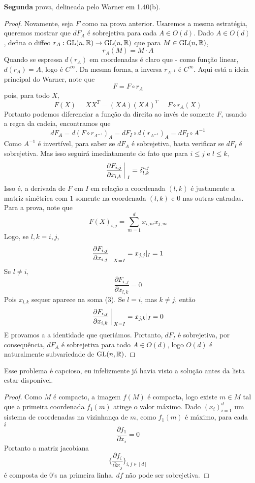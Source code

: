 \textbf{Segunda} prova, delineada pelo Warner em 1.40(b).
\begin{proof}
    Novamente, seja $F$ como na prova anterior. Usaremos a mesma estratégia, queremos mostrar 
    que $dF_A$ é sobrejetiva para cada $A \in O(d)$. Dado $A \in O(d)$, defina o diffeo $r_A : \text{GL}(n,\mathbb{R}) \rightarrow \text{GL}(n,\mathbb{R})$ 
    que para $M \in \text{GL}(n,\mathbb{R})$,
    $$r_A(M) = M\cdot A$$
    Quando se espressa $d(r_A)$ em coordenadas é claro que - como função linear, $d(r_A) = A$, logo é $C^\infty$. Da mesma forma, a inversa 
    $r_{A^{-1}}$ é $C^\infty$. Aqui está a ideia principal do Warner, note que 
    $$F = F \circ r_A$$
    pois, para todo $X$,
    $$F(X) = XX^T = (XA)(XA)^T = F \circ r_A (X)$$
    Portanto podemos diferenciar a função da direita ao invés de somente $F$, usando a regra da cadeia, encontramos que
    $$dF_A = d(F \circ r_{A^{-1}})_A = dF_{I} \circ d(r_{A^{-1}})_A = dF_{I} \circ A^{-1}$$
    Como $A^{-1}$ é invertível, para saber se $dF_A$ é sobrejetiva, basta verificar se $dF_I$ é sobrejetiva.
    Mas isso seguirá imediatamente do fato que para $i \leq j$ e $l \leq k$,
    $$\frac{\partial F_{i,j}}{\partial x_{l,k}}\bigg\arrowvert_I = \delta^{i,j}_{l,k}$$
    Isso é, a derivada de $F$ em $I$ em relação a coordenada $(l,k)$ é justamente a matriz simétrica com $1$ somente na 
    coordenada $(l,k)$ e $0$ nas outras entradas.
    Para a prova, note que
    \begin{equation}
        F(X)_{i,j} = \sum_{m = 1}^{d} x_{i,m}  x_{j,m}
    \end{equation}
    Logo, se $l,k = i,j$,
    $$\frac{\partial F_{i,j}}{\partial x_{i,j}}\bigg\arrowvert_{X = I} = x_{j,j}|_I = 1$$
    Se $l \neq i$,
    $$\frac{\partial F_{i,j}}{\partial x_{l,k}} = 0$$
    Pois $x_{l,k}$ sequer aparece na soma (3). Se $l = i$, mas $k \neq j$,
    então
    $$\frac{\partial F_{i,j}}{\partial x_{i,k}}\bigg\arrowvert_{X = I} = x_{j,k}|_I = 0$$
    E provamos a a identidade que queriámos. Portanto, $dF_I$ é sobrejetiva, por consequência, $dF_A$ é sobrejetiva 
    para todo $A \in O(d)$, logo $O(d)$ é naturalmente subvariedade de $\text{GL}(n,\mathbb{R})$.


\end{proof}


\begin{problem}
    \label{prob:l2:5}
\end{problem}
Esse problema é capcioso, eu infelizmente já havia visto a solução antes da lista estar disponível.
\begin{proof}
    Como $M$ é compacto, a imagem $f(M)$ é compacta, logo existe $m \in M$ tal que a primeira coordenada $f_1(m)$ atinge o valor máximo.
    Dado $(x_i)_{i=1}^d$ um sistema de coordenadas na vizinhança de $m$,  como $f_1(m)$ é máximo, para cada $i$
    $$\frac{\partial f_1}{\partial x_i} = 0$$
    Portanto a matriz jacobiana 
    $$\bigg\{ \frac{\partial f_i}{\partial x_j}\bigg\}_{i,j \in [d]}$$
    é composta de $0$'s na primeira linha. $df$ não pode ser sobrejetiva.  
\end{proof}